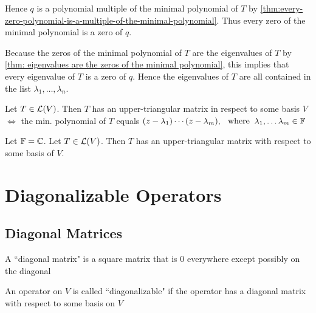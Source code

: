 \begin{prf}
  Hence $q$ is a polynomial multiple of the minimal polynomial of $T$ by \autoref{thm:every-zero-polynomial-is-a-multiple-of-the-minimal-polynomial}. Thus every zero of the minimal polynomial is a zero of $q$.
  
  Because the zeros of the minimal polynomial of $T$ are the eigenvalues of $T$ by \autoref{thm: eigenvalues are the zeros of the minimal polynomial}, this implies that every eigenvalue of $T$ is a zero of $q$. Hence the eigenvalues of $T$ are all contained in the list $\lambda_1, \ldots, \lambda_n$.
\end{prf}


\setcounter{thm}{43}
\begin{thm}
  \label{thm:necessary and sufficient condition to have an upper-triangular-matrix}
  Let $T\in \mathcal{L}(V)$\footnotemark[1]. Then $T$ has an upper-triangular matrix in respect to some basis $V$ $\iff$ the min. polynomial of $T$ equals $(z-\lambda_1) \cdots (z-\lambda_m), \;\;\, \text{where}\;\; \lambda_1, \dots \lambda_m \in \mathbb{F}$
\end{thm}

\setcounter{thm}{46}
\begin{thm}
  \label{thm: necessary condition for every operator to have an upper-triangular matrix}
  Let $\mathbb{F} = \mathbb{C}$. Let $T\in \mathcal{L} (V)$\footnotemark[1]. Then $T$ has an upper-triangular matrix with respect to some basis of $V$.
\end{thm}

\setcounter{footnote}{1}

\pagebreak

\section{Diagonalizable Operators}
\subsection{Diagonal Matrices}

\setcounter{thm}{47}
\begin{mydef} 
  A ``diagonal matrix" is a square matrix that is $0$ everywhere except possibly on \nopagebreak the diagonal
\end{mydef}

\setcounter{thm}{49}
\begin{mydef} [diagonalizable]
  An operator on $V$ is called ``diagonalizable" if the operator has a diagonal matrix with respect to some basis on $V$
\end{mydef}

